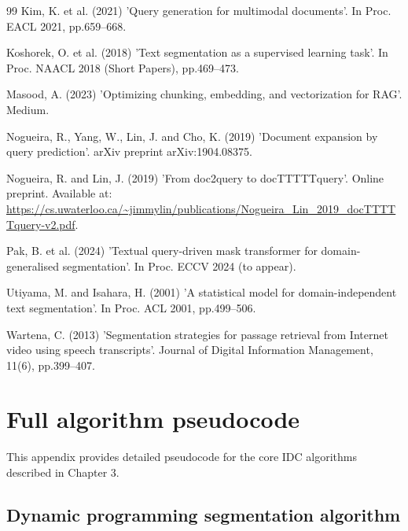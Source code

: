 \documentclass[12pt,a4paper]{report}
\begin{document}
\begin{thebibliography}{99}
 Kim, K. et al. (2021) 'Query generation for multimodal documents'. In Proc. EACL 2021, pp.659--668.

 Koshorek, O. et al. (2018) 'Text segmentation as a supervised learning task'. In Proc. NAACL 2018 (Short Papers), pp.469--473.

 Masood, A. (2023) 'Optimizing chunking, embedding, and vectorization for RAG'. Medium.

 Nogueira, R., Yang, W., Lin, J. and Cho, K. (2019) 'Document expansion by query prediction'. arXiv preprint arXiv:1904.08375.

 Nogueira, R. and Lin, J. (2019) 'From doc2query to docTTTTTquery'. Online preprint. Available at: \url{https://cs.uwaterloo.ca/~jimmylin/publications/Nogueira_Lin_2019_docTTTTTquery-v2.pdf}.

 Pak, B. et al. (2024) 'Textual query-driven mask transformer for domain-generalised segmentation'. In Proc. ECCV 2024 (to appear).

 Utiyama, M. and Isahara, H. (2001) 'A statistical model for domain-independent text segmentation'. In Proc. ACL 2001, pp.499--506.

 Wartena, C. (2013) 'Segmentation strategies for passage retrieval from Internet video using speech transcripts'. Journal of Digital Information Management, 11(6), pp.399--407.

\end{thebibliography}

\appendix

\chapter{Full algorithm pseudocode}

This appendix provides detailed pseudocode for the core IDC algorithms described in Chapter 3.

\section{Dynamic programming segmentation algorithm}
\end{document}
